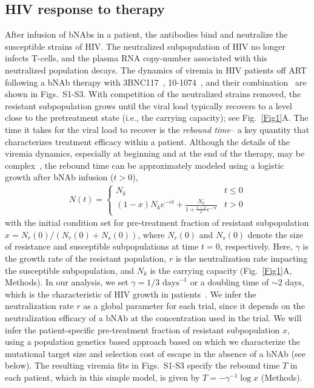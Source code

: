 \documentclass[aps,prx,noshowpacs,twocolumn,nofootinbib]{revtex4-2}
\begin{document}
\subsection*{HIV response to therapy}
After infusion of bNAbs in a patient, the antibodies bind and neutralize the susceptible strains of HIV. The neutralized subpopulation of HIV no longer infects T-cells, 
	and the plasma RNA copy-number associated with this neutralized population decays. The dynamics of viremia in HIV patients off ART following a bNAb therapy with 3BNC117~\cite{Caskey:2015hm}, 10-1074~\cite{Caskey:2017el}, and their combination~\cite{bar-onSafetyAntiviralActivity2018} are shown in Figs.~S1-S3.
With competition of the neutralized strains removed,	the resistant subpopulation grows until the viral load typically recovers to a level close to the pretreatment state (i.e., the carrying capacity); see Fig.~\ref{Fig1}A. The time it takes for the viral load to recover is the {\em rebound time}-- a key quantity that characterizes treatment efficacy within a patient. Although the details of the viremia dynamics, especially at beginning and at the end of the therapy,  may be complex~\cite{Lu:2016id,Reeves:2020ca,Saha:2020fd,meijersPredictingVivoEscape2021}, the rebound time  can be approximately modeled using a logistic growth after bNAb infusion ($t>0$),
\begin{align}
\label{eq:logisticpiecewise}
N(t) = 
\begin{cases}
N_k 
	& t \leq 0 \\
(1-x) N_k e^{-r t} + \frac{N_k}{1+ \frac{1-x}{x}e^{- \gamma t}}
	& t>0
\end{cases}
\end{align}
with the initial condition set for pre-treatment fraction of resistant subpopulation $x=  N_r(0)/ (N_r(0) + N_s (0))$, where $N_r(0)$ and $N_s(0)$ denote the size of resistance and susceptible subpopulations at time $t=0$, respectively. Here, $\gamma$ is the growth rate of the resistant population, $r$ is the neutralization rate impacting the susceptible subpopulation, and $N_k$ is the carrying capacity (Fig.~\ref{Fig1}A, Methods).  In our analysis, we set $\gamma = 1/3 \text{ days}^{-1}$ or a doubling time of $\sim 2$ days, which is the characteristic of HIV growth in patients~\cite{Perelson:1996hv}. We infer the neutralization rate $r$ as a global parameter for each trial, since it depends on the neutralization efficacy of a bNAb at the concentration used in the trial. We will infer the patient-specific pre-treatment fraction  of resistant subpopulation $x$, using a population genetics based approach based on which we characterize the mutational target size and selection cost of escape in the absence of a bNAb (see below).  The resulting viremia fits in Figs.~S1-S3 specify the rebound time $T$ in each patient, which in this simple model, is given by $T =-\gamma^{-1} \log x$ (Methods).
\end{document}
